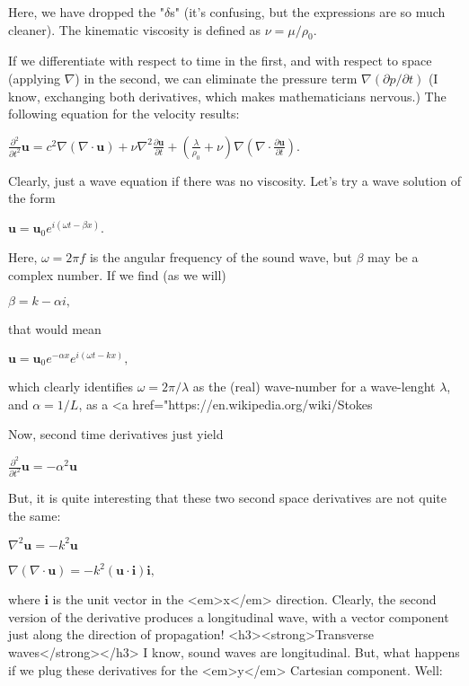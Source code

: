 Here, we have dropped the "$ \delta$s" (it's confusing, but the expressions are so much cleaner). The kinematic viscosity is defined as $ \nu=\mu/\rho_0$.

If we differentiate with respect to time in the first, and with respect to space (applying $ \nabla$) in the second, we can eliminate the pressure term $ \nabla(\partial p/\partial t)$ (I know, exchanging both derivatives, which makes mathematicians nervous.) The following equation for the velocity results:

$ \frac{\partial^2 }{\partial t^2 } \mathbf{u} =c^2\nabla (\nabla\cdot\mathbf{u})  + \nu  \nabla^2\frac{\partial\mathbf{u}}{\partial t}  + \left(\frac{\lambda}{\rho_0}+\nu\right) \nabla (\nabla\cdot \frac{\partial\mathbf{u}}{\partial t}   )  .$

Clearly, just a wave equation if there was no viscosity. Let's try a wave solution of the form

$ \mathbf{u} = \mathbf{u}_0 e^{i(\omega t - \beta x)} .$

Here, $ \omega=2\pi f$ is the angular frequency of the sound wave, but  $ \beta$ may be a complex number. If we find (as we will)

$  \beta =  k - \alpha i ,$

that would mean

$ \mathbf{u} = \mathbf{u}_0e^{- \alpha x} e^{i(\omega t - k x)} ,$

which clearly identifies $ \omega=2\pi /\lambda$ as the (real) wave-number for a wave-lenght $ \lambda$, and $ \alpha=1 /L $, as a <a href="https://en.wikipedia.org/wiki/Stokes%

Now, second time derivatives just yield

$ \frac{\partial^2 }{\partial t^2 } \mathbf{u} = -\alpha^2 \mathbf{u}$

But, it is quite interesting that these two second space derivatives are not quite the same:

$ \nabla^2 \mathbf{u} =  -k^2 \mathbf{u}$

$ \nabla (\nabla\cdot \mathbf{u} ) = -k^2 (\mathbf{u}\cdot\mathbf{i})\mathbf{i} ,$

where $ \mathbf{i} $ is the unit vector in the <em>x</em> direction. Clearly, the second version of the derivative produces a longitudinal wave, with a vector component just along the direction of propagation!
<h3><strong>Transverse waves</strong></h3>
I know, sound waves are longitudinal. But, what happens if we plug these derivatives for the <em>y</em> Cartesian component. Well:

